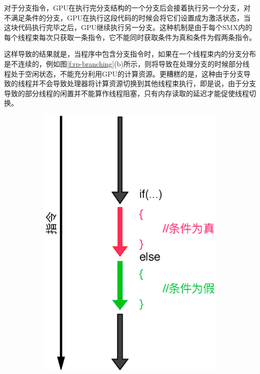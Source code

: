 对于分支指令，GPU在执行完分支结构的一个分支后会接着执行另一个分支，对不满足条件的分支，GPU在执行这段代码的时候会将它们设置成为激活状态，当这块代码执行完毕之后，GPU继续执行另一分支。这种机制是由于每个SMX内的每个线程束每次只获取一条指令，它不能同时获取条件为真和条件为假两条指令。

这样导致的结果就是，当程序中包含分支指令时，如果在一个线程束内的分支分布是不连续的，例如图\ref{f:rp-branching}(b)所示，则将导致在处理分支的时候部分线程处于空闲状态，不能充分利用GPU的计算资源。更糟糕的是，这种由于分支导致的线程并不会导致处理器将计算资源切换到其他线程束执行，即是说，由于分支导致的部分线程的闲置并不能算作线程阻塞，只有内存读取的延迟才能促使线程切换。

\begin{figure}
\begin{fullwidth}
	\begin{subfigure}[b]{0.24\thewidth}
		\includegraphics[width=1.\textwidth]{figures/rp/branching-1}

\end{subfigure}
\end{fullwidth}
\end{figure}
